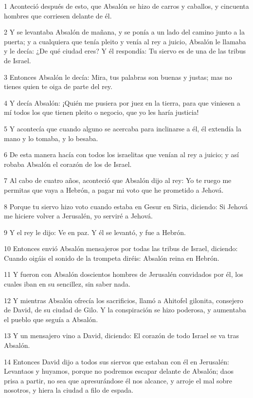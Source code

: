\par 1 Aconteció después de esto, que Absalón se hizo de carros y caballos, y cincuenta hombres que corriesen delante de él.
\par 2 Y se levantaba Absalón de mañana, y se ponía a un lado del camino junto a la puerta; y a cualquiera que tenía pleito y venía al rey a juicio, Absalón le llamaba y le decía: ¿De qué ciudad eres? Y él respondía: Tu siervo es de una de las tribus de Israel.
\par 3 Entonces Absalón le decía: Mira, tus palabras son buenas y justas; mas no tienes quien te oiga de parte del rey.
\par 4 Y decía Absalón: ¡Quién me pusiera por juez en la tierra, para que viniesen a mí todos los que tienen pleito o negocio, que yo les haría justicia! 
\par 5 Y acontecía que cuando alguno se acercaba para inclinarse a él, él extendía la mano y lo tomaba, y lo besaba.
\par 6 De esta manera hacía con todos los israelitas que venían al rey a juicio; y así robaba Absalón el corazón de los de Israel.
\par 7 Al cabo de cuatro años, aconteció que Absalón dijo al rey: Yo te ruego me permitas que vaya a Hebrón, a pagar mi voto que he prometido a Jehová.
\par 8 Porque tu siervo hizo voto cuando estaba en Gesur en Siria, diciendo: Si Jehová me hiciere volver a Jerusalén, yo serviré a Jehová.
\par 9 Y el rey le dijo: Ve en paz. Y él se levantó, y fue a Hebrón.
\par 10 Entonces envió Absalón mensajeros por todas las tribus de Israel, diciendo: Cuando oigáis el sonido de la trompeta diréis: Absalón reina en Hebrón.
\par 11 Y fueron con Absalón doscientos hombres de Jerusalén convidados por él, los cuales iban en su sencillez, sin saber nada.
\par 12 Y mientras Absalón ofrecía los sacrificios, llamó a Ahitofel gilonita, consejero de David, de su ciudad de Gilo. Y la conspiración se hizo poderosa, y aumentaba el pueblo que seguía a Absalón.
\par 13 Y un mensajero vino a David, diciendo: El corazón de todo Israel se va tras Absalón.
\par 14 Entonces David dijo a todos sus siervos que estaban con él en Jerusalén: Levantaos y huyamos, porque no podremos escapar delante de Absalón; daos prisa a partir, no sea que apresurándose él nos alcance, y arroje el mal sobre nosotros, y hiera la ciudad a filo de espada.
